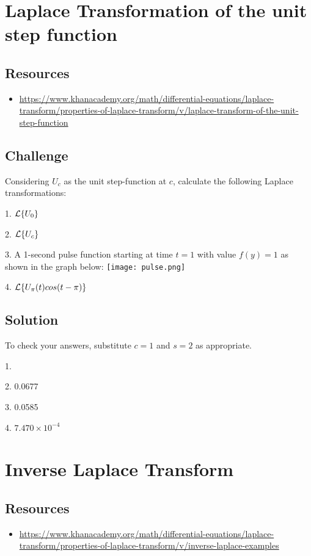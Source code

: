 \section{Laplace Transformation of the unit step function}

\subsection*{Resources}
\begin{itemize}
    \item \url{https://www.khanacademy.org/math/differential-equations/laplace-transform/properties-of-laplace-transform/v/laplace-transform-of-the-unit-step-function} %
\end{itemize}

\subsection*{Challenge}
Considering $U_c$ as the unit step-function at $c$, calculate the following Laplace transformations:

1. $\displaystyle \mathcal{L}\{U_0\}$

2. $\displaystyle \mathcal{L}\{U_c\}$

3. A 1-second pulse function starting at time $t=1$ with value $f(y)=1$ as shown in the graph below:
\texttt{[image: pulse.png]}

4. $\displaystyle \mathcal{L}\{U_\pi(t) cos(t-\pi)\}$

\subsection*{Solution}
To check your answers, substitute $c=1$ and $s=2$ as appropriate.

1. 

2. 0.0677

3. 0.0585

4. $7.470 \times 10^{-4}$




\newpage
\section{Inverse Laplace Transform}

\subsection*{Resources}
\begin{itemize}
    \item \url{https://www.khanacademy.org/math/differential-equations/laplace-transform/properties-of-laplace-transform/v/inverse-laplace-examples} %
\end{itemize}

